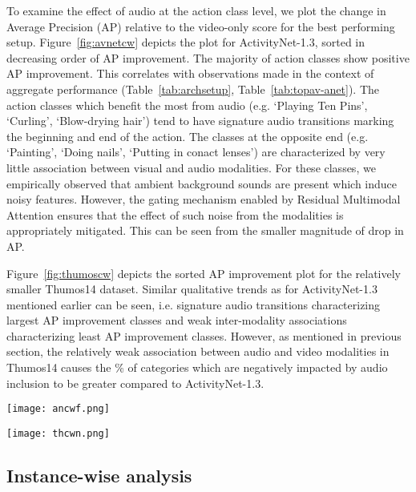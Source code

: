 \documentclass[10pt,twocolumn,letterpaper]{article}
\begin{document}
To examine the effect of audio at the action class level, we plot the change in Average Precision (AP) relative to the video-only score for the best performing setup. Figure~\ref{fig:avnetcw} depicts the plot for ActivityNet-1.3, sorted in decreasing order of AP improvement. The majority of action classes show positive AP improvement. This correlates with observations made in the context of aggregate performance (Table~\ref{tab:archsetup}, Table~\ref{tab:topav-anet}).
The action classes which benefit the most from audio (e.g. `Playing Ten Pins', `Curling', `Blow-drying hair') tend to have signature audio transitions marking the beginning and end of the action. The classes at the opposite end (e.g. `Painting', `Doing nails', `Putting in conact lenses') are characterized by very little association between visual and audio modalities. For these classes, we empirically observed that ambient background sounds are present which induce noisy features. However, the gating mechanism enabled by Residual Multimodal Attention ensures that the effect of such noise from the modalities is appropriately mitigated. This can be seen from the smaller magnitude of drop in AP.

Figure~\ref{fig:thumoscw} depicts the sorted AP improvement plot for the relatively smaller Thumos14 dataset. Similar qualitative trends as for ActivityNet-1.3 mentioned earlier can be seen, i.e. signature audio transitions characterizing largest AP improvement classes and weak inter-modality associations characterizing least AP improvement classes. However, as mentioned in previous section, the relatively weak association between audio and video modalities in Thumos14 causes the \% of categories which are negatively impacted by audio inclusion to be greater compared to ActivityNet-1.3.

\begin{figure*}[!t]
\centering
\texttt{[image: ancwf.png]}
\caption{[ActivityNet-1.3] Relative change in per-class AP of the best multimodal setup (Table~\ref{tab:archsetup}) with inclusion of audio.} 
\label{fig:avnetcw}
\end{figure*}

\begin{figure*}[!t]
\centering
\texttt{[image: thcwn.png]}
\caption{[THUMOS14] Relative change in per-class AP of the best multimodal setup (Table~\ref{tab:archsetup}) with inclusion of audio.} 
\label{fig:thumoscw}
\end{figure*}

\subsection{Instance-wise analysis} 
\end{document}
